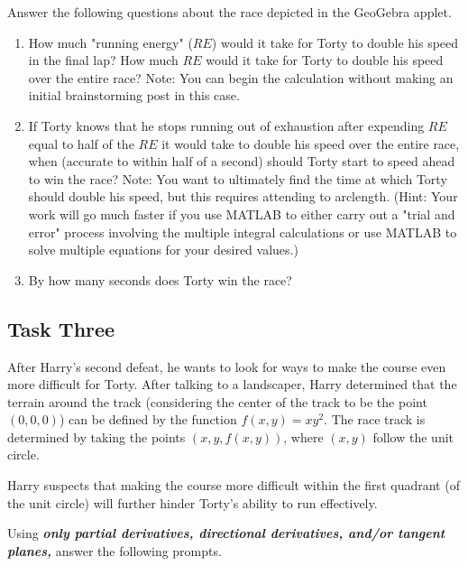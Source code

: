 \documentclass{ximera}
\begin{document}
Answer the following questions about the race depicted in the GeoGebra applet.

\begin{enumerate}
\item How much "running energy" ($RE$) would it take for Torty to double his speed in the final lap? How much $RE$ would it take for Torty to double his speed over the entire race? Note: You can begin the calculation without making an initial brainstorming post in this case.

\item If Torty knows that he stops running out of exhaustion after expending $RE$ equal to half of the $RE$ it would take to double his speed over the entire race, when (accurate to within half of a second) should Torty start to speed ahead to win the race? Note: You want to ultimately find the time at which Torty should double his speed, but this requires attending to arclength. (Hint: Your work will go much faster if you use MATLAB to either carry out a "trial and error" process involving the multiple integral calculations or use MATLAB to solve multiple equations for your desired values.)

\item By how many seconds does Torty win the race?
\end{enumerate}

\subsection{Task Three}

After Harry's second defeat, he wants to look for ways to make the course even more difficult for Torty. After talking to a landscaper, Harry determined that the terrain around the track (considering the center of the track to be the point $(0,0,0)$) can be defined by the function $f(x,y)=xy^2$. The race track is determined by taking the points $(x,y,f(x,y))$, where $(x,y)$ follow the unit circle.

Harry suspects that making the course more difficult within the first quadrant (of the unit circle) will further hinder Torty's ability to run effectively.

\begin{center}
\end{center}

Using \textbf{\emph{only partial derivatives, directional derivatives, and/or tangent planes,}} answer the following prompts.
\end{document}
